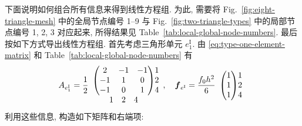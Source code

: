 {下面说明如何组合所有信息来得到线性方程组. 为此, 需要将 Fig.\ \ref{fig:eight-triangle-mesh} 中的全局节点编号 1--9 与 Fig.\ \ref{fig:two-triangle-types} 中的局部节点编号 1, 2, 3 对应起来, 所得结果见 Table\ \ref{tab:local-global-node-numbers}. 最后按如下方式导出线性方程组. 首先考虑三角形单元 $e_1^{\mathrm I}$. 由 \eqref{eq:type-one-element-matrix} 和 Table\ \ref{tab:local-global-node-numbers} 有}
\[A_{e_1^{\mathrm I}}=\frac12\begin{array}{c@{}c}
\begin{pmatrix}2&-1&-1\\-1&1&0\\-1&0&1\end{pmatrix}&\begin{matrix}1\\2\\4\end{matrix}\\
\begin{matrix}1&2&4\end{matrix}&\end{array},\quad
\boldsymbol{f}_{e^{\mathrm I}}=\frac{f_0h^2}{6}\begin{array}{c@{}c}\begin{pmatrix}1\\1\\1\end{pmatrix}&\begin{matrix}1\\2\\4\end{matrix}\end{array}\]
{利用这些信息, 构造如下矩阵和右端项:}
